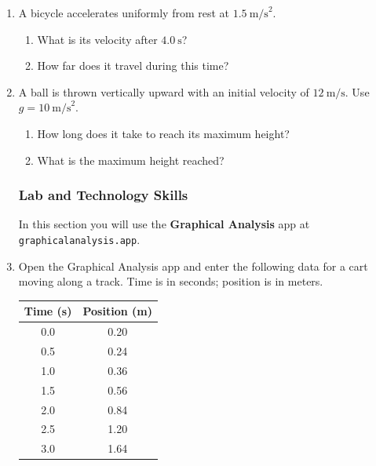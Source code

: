 \documentclass[12pt, twoside]{article}
\begin{document}
\begin{enumerate}[itemsep=0.5cm]
\newpage
\subsubsection*{Kinematics Equations}

\textbf{Formulas:} \quad $v = v_0 + at$ \quad\quad $d = v_0 t + \frac{1}{2}at^2$ \quad\quad $v^2 = v_0^2 + 2ad$ \quad\quad $d = \frac{1}{2}(v_0 + v)t$

\vspace{1cm}

\item A bicycle accelerates uniformly from rest at $1.5~\text{m/s}^2$.
  \begin{enumerate}[itemsep=3cm]
    \item What is its velocity after $4.0~\text{s}$?
    \item How far does it travel during this time?
  \end{enumerate}
  \vspace{2cm}

\item A ball is thrown vertically upward with an initial velocity of $12~\text{m/s}$. Use $g = 10~\text{m/s}^2$.
  \begin{enumerate}[itemsep=3cm]
    \item How long does it take to reach its maximum height?
    \item What is the maximum height reached?
  \end{enumerate}

\newpage
\subsubsection*{Lab and Technology Skills}

In this section you will use the \textbf{Graphical Analysis} app at \texttt{graphicalanalysis.app}.

\vspace{0.5cm}

\item Open the Graphical Analysis app and enter the following data for a cart moving along a track. Time is in seconds; position is in meters.

\begin{center}
\begin{tabular}{|c|c|}
\hline
\textbf{Time (s)} & \textbf{Position (m)} \\
\hline
0.0 & 0.20 \\
0.5 & 0.24 \\
1.0 & 0.36 \\
1.5 & 0.56 \\
2.0 & 0.84 \\
2.5 & 1.20 \\
3.0 & 1.64 \\
\hline
\end{tabular}
\end{center}


\end{enumerate}
\end{document}
